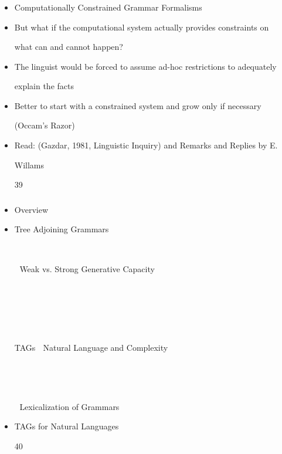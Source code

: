 \documentclass[compress,color=usenames]{beamer}
\begin{document}
\begin{frame}
\frametitle{}

\begin{itemize}
\item

Computationally Constrained Grammar Formalisms





\item But what if the computational system actually provides constraints on


what can and cannot happen?





\item The linguist would be forced to assume ad-hoc restrictions to adequately


explain the facts





\item Better to start with a constrained system and grow only if necessary


(Occam's Razor)





\item Read: (Gazdar, 1981, Linguistic Inquiry) and Remarks and Replies by E.


Willams


39




\end{itemize}

\end{frame}

\begin{frame}
\frametitle{}

\begin{itemize}
\item

Overview





\item Tree Adjoining Grammars





 Weak vs. Strong Generative Capacity











TAGs  Natural Language and Complexity








 Lexicalization of Grammars





\item TAGs for Natural Languages





40




\end{itemize}

\end{frame}
\end{document}

